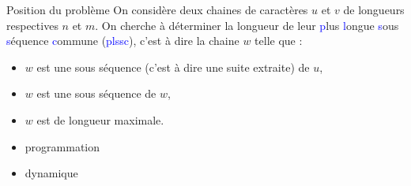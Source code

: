 \documentclass[10pt]{beamer}
\begin{document}
\begin{frame}{\Ctitle}{\stitle}
	\begin{exampleblock}{Position du problème}
		On considère deux chaines de caractères $u$ et $v$ de longueurs respectives $n$ et $m$. On cherche à déterminer la longueur de leur \textcolor{blue}{p}lus \textcolor{blue}{l}ongue \textcolor{blue}{s}ous \textcolor{blue}{s}équence \textcolor{blue}{c}ommune (\textcolor{blue}{\sc plssc}), c'est à dire la chaine $w$ telle que :
		\begin{itemize}
			\item<2-> $w$ est une sous séquence (c'est à dire une suite extraite) de $u$,
			\item<3-> $w$ est une sous séquence de $w$,
			\item<4-> $w$ est de longueur maximale.
		\end{itemize}
		\begin{itemize}
			\item<6-> {\sc progr\textcolor{BrickRed}{a}m\textcolor{BrickRed}{m}at\textcolor{BrickRed}{i}on}
			\item<7-> {\sc dyn\textcolor{BrickRed}{ami}que}
		\end{itemize}
	\end{exampleblock}
\end{frame}
\end{document}
